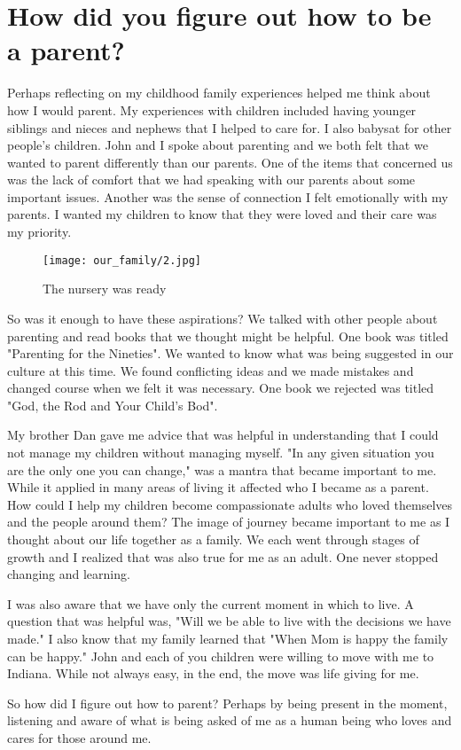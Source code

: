\section{How did you figure out how to be a parent?}
Perhaps reflecting on my childhood family experiences helped me think about how I would parent.
My experiences with children included having younger siblings and nieces and nephews that I helped to care for.
I also babysat for other people's children.
John and I spoke about parenting and we both felt that we wanted to parent differently than our parents.
One of the items that concerned us was the lack of comfort that we had speaking with our parents about some important issues.
Another was the sense of connection I felt emotionally with my parents.
I wanted my children to know that they were loved and their care was my priority.
\begin{figure}
\centering
\texttt{[image: our\_family/2.jpg]}
\caption{
The nursery was ready
}
\end{figure}

So was it enough to have these aspirations? We talked with other people about parenting and read books that we thought might be helpful.
One book was titled "Parenting for the Nineties".
We wanted to know what was being suggested in our culture at this time.
We found conflicting ideas and we made mistakes and changed course when we felt it was necessary.
One book we rejected was titled "God, the Rod and Your Child's Bod".

My brother Dan gave me advice that was helpful in understanding that I could not manage my children without managing myself.
"In any given situation you are the only one you can change," was a mantra that became important to me.
While it applied in many areas of living it affected who I became as a parent.
How could I help my children become compassionate adults who loved themselves and the people around them?
The image of journey became important to me as I thought about our life together as a family.
We each went through stages of growth and I realized that was also true for me as an adult.
One never stopped changing and learning.

I was also aware that we have only the current moment in which to live.
A question that was helpful was, "Will we be able to live with the decisions we have made."
I also know that my family learned that "When Mom is happy the family can be happy."
John and each of you children were willing to move with me to Indiana.
While not always easy, in the end, the move was life giving for me.

So how did I figure out how to parent? Perhaps by being present in the moment, listening and aware of what is being asked of me as a human being who loves and cares for those around me.

